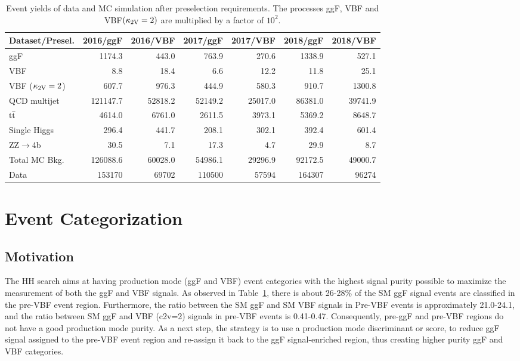 \begin{table}[htb]
\caption[Event yields of data and MC simulation after preselection requirements]{\label{event_selection:tab:presel} Event yields of data and MC simulation after preselection requirements. The processes ggF, VBF and VBF$(\mathrm{\kappa_{2V} }=2)$ are multiplied by a factor of $10^{2}$.}
\centering
\begin{tabularx}{\textwidth}{lrrrrrr}
	\hline
	Dataset/Presel.           & 2016/ggF  & 2016/VBF & 2017/ggF  & 2017/VBF & 2018/ggF & 2018/VBF \\
	\hline
    ggF                       &   1174.3 &  443.0  &    763.9 &  270.6  &   1338.9 &  527.1  \\ 
    VBF                       &      8.8 &   18.4  &      6.6 &   12.2  &     11.8 &   25.1  \\ 
    VBF ($\mathrm{\kappa_{2V} }=2$)            &    607.7 &  976.3  &    444.9 &  580.3  &    910.7 &  1300.8 \\ 
    QCD multijet              & 121147.7 & 52818.2 &  52149.2 & 25017.0 &  86381.0 & 39741.9 \\ 
    $\mathrm{t\overline{t}}$                  &   4614.0 &  6761.0 &   2611.5 &  3973.1 &   5369.2 &  8648.7 \\ 
    Single Higgs              &    296.4 &  441.7  &    208.1 &  302.1  &    392.4 &  601.4  \\ 
    ZZ$\rightarrow$4b         &     30.5 &   7.1   &     17.3 &   4.7   &     29.9 &   8.7   \\  
    Total MC Bkg.             & 126088.6 & 60028.0 &  54986.1 & 29296.9 &  92172.5 & 49000.7 \\ 
    Data                      & 153170 & 69702 & 110500 & 57594 & 164307 & 96274 \\ 
	\hline
\end{tabularx}
\end{table}

\clearpage
\section{Event Categorization} \label{sec:categories} 
\subsection{Motivation}
The HH search aims at having production mode (ggF and VBF) event categories with the highest signal purity possible to maximize the measurement of both the ggF and VBF signals.  As observed in Table~\ref{event_selection:tab:presel}, there is about 26-28\% of the SM ggF signal events are classified in the pre-VBF event region. Furthermore, the ratio between the SM ggF and SM VBF signals in Pre-VBF events is approximately 21.0-24.1, and the ratio between SM ggF and VBF (c2v=2) signals in pre-VBF events is 0.41-0.47. Consequently, pre-ggF and pre-VBF regions do not have a good production mode purity. As a next step, the strategy is to use a production mode discriminant or score, to reduce ggF signal assigned to the pre-VBF event region and re-assign it back to the ggF signal-enriched region, thus creating higher purity ggF and VBF categories. 

